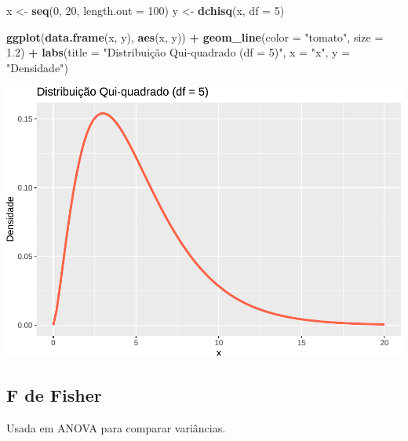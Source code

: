 \documentclass[
]{book}
\newenvironment{Shaded}{\begin{snugshade}}{\end{snugshade}}
\newcommand{\AttributeTok}[1]{\textcolor[rgb]{0.13,0.29,0.53}{#1}}
\newcommand{\DecValTok}[1]{\textcolor[rgb]{0.00,0.00,0.81}{#1}}
\newcommand{\FloatTok}[1]{\textcolor[rgb]{0.00,0.00,0.81}{#1}}
\newcommand{\FunctionTok}[1]{\textcolor[rgb]{0.13,0.29,0.53}{\textbf{#1}}}
\newcommand{\NormalTok}[1]{#1}
\newcommand{\OtherTok}[1]{\textcolor[rgb]{0.56,0.35,0.01}{#1}}
\newcommand{\SpecialCharTok}[1]{\textcolor[rgb]{0.81,0.36,0.00}{\textbf{#1}}}
\newcommand{\StringTok}[1]{\textcolor[rgb]{0.31,0.60,0.02}{#1}}
\begin{document}
\begin{Shaded}
\begin{Highlighting}[]
\NormalTok{x }\OtherTok{\textless{}{-}} \FunctionTok{seq}\NormalTok{(}\DecValTok{0}\NormalTok{, }\DecValTok{20}\NormalTok{, }\AttributeTok{length.out =} \DecValTok{100}\NormalTok{)}
\NormalTok{y }\OtherTok{\textless{}{-}} \FunctionTok{dchisq}\NormalTok{(x, }\AttributeTok{df =} \DecValTok{5}\NormalTok{)}

\FunctionTok{ggplot}\NormalTok{(}\FunctionTok{data.frame}\NormalTok{(x, y), }\FunctionTok{aes}\NormalTok{(x, y)) }\SpecialCharTok{+}
  \FunctionTok{geom\_line}\NormalTok{(}\AttributeTok{color =} \StringTok{"tomato"}\NormalTok{, }\AttributeTok{size =} \FloatTok{1.2}\NormalTok{) }\SpecialCharTok{+}
  \FunctionTok{labs}\NormalTok{(}\AttributeTok{title =} \StringTok{"Distribuição Qui{-}quadrado (df = 5)"}\NormalTok{, }\AttributeTok{x =} \StringTok{"x"}\NormalTok{, }\AttributeTok{y =} \StringTok{"Densidade"}\NormalTok{)}
\end{Highlighting}
\end{Shaded}

\includegraphics{Livro-Estatistica+R_files/figure-latex/chisq-1.pdf}

\subsection{F de Fisher}\label{f-de-fisher}

Usada em ANOVA para comparar variâncias.
\end{document}
